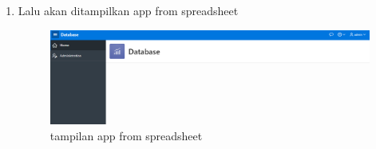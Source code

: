\begin{enumerate}
\begin{figure}[!htbp]
    \end{figure}
    \item Lalu akan ditampilkan app from spreadsheet
      \begin{figure}[!htbp]
        \centering
        \includegraphics[scale=0.4]{figures/fini.PNG}
        \caption{tampilan app from spreadsheet}
    \end{figure}
\end{enumerate}

